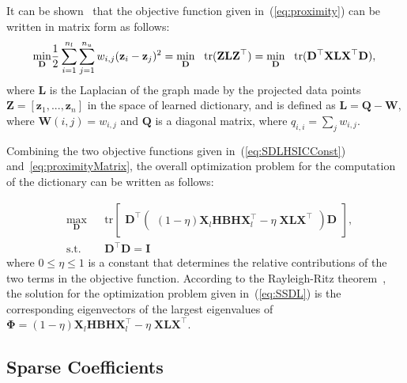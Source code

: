 \documentclass{llncs}
\begin{document}
It can be shown~\cite{misc:Luxburg07} that the objective function given in~(\ref{eq:proximity}) can be written in matrix form as follows:
\begin{equation}\label{eq:proximityMatrix}
\underset{\mathbf{D}}{\text{min}}
\frac{1}{2}\sum_{i=1}^{n_l}\sum_{j=1}^{n_u}w_{i,j}(\mathbf{z}_i - \mathbf{z}_j)^2=\underset{\mathbf{D}}{\text{min}}\;\;\;\textup{tr}(\mathbf{ZLZ}^{\top})=\underset{\mathbf{D}}{\text{min}}\;\;\;\textup{tr}(\mathbf{D}^{\top}\mathbf{XLX}^{\top}\mathbf{D}), \\
\end{equation}
where $\mathbf{L}$ is the Laplacian of the graph made by the projected data points $\mathbf{Z}=[\mathbf{z}_1,...,\mathbf{z}_n]$ in the space of learned dictionary, and is defined as $\mathbf{L}=\mathbf{Q}-\mathbf{W}$, where $\mathbf{W}(i,j)=w_{i,j}$ and $\mathbf{Q}$ is a diagonal matrix, where $q_{i,i}=\sum_j w_{i,j}$.

Combining the two objective functions given in~(\ref{eq:SDLHSICConst}) and~\ref{eq:proximityMatrix}, the overall optimization problem for the computation of the dictionary can be written as follows:

\begin{equation}\label{eq:SSDL}
\begin{aligned}
& \underset{\mathbf{D}}{\text{max}}
& & \text{tr}\begin{bmatrix}\mathbf{D}^{\top}\begin{pmatrix}(1-\eta)\mathbf{X}_l\mathbf{HBH}\mathbf{X}_l^{\top} - \eta\;\mathbf{XLX}^{\top}\end{pmatrix}\mathbf{D}\end{bmatrix}, \\
& \text{s.t.}
& & \mathbf{D}^{\top}\mathbf{D}=\mathbf{I}
\end{aligned}
\end{equation}
where $0\leq\eta\leq 1$ is a constant that determines the relative contributions of the two terms in the objective function. According to the Rayleigh-Ritz theorem~\cite{book:Lutkepohl96}, the solution for the optimization problem given in~(\ref{eq:SSDL}) is the corresponding eigenvectors of the largest eigenvalues of $\mathbf{\Phi}=(1-\eta)\mathbf{X}_l\mathbf{HBH}\mathbf{X}_l^{\top} - \eta\;\mathbf{XLX}^{\top}$.

\subsection{Sparse Coefficients}
\label{ssec:sparseCoeff}
\end{document}
